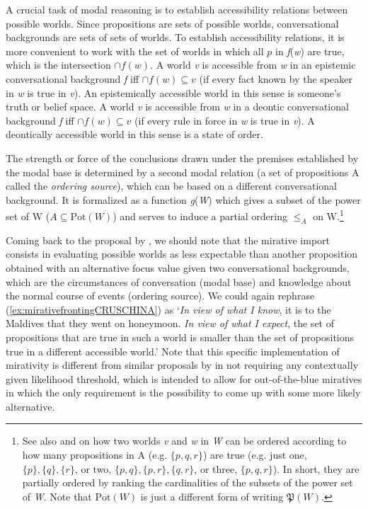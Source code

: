 A crucial task of modal reasoning is to establish accessibility relations between possible worlds. Since propositions are sets of possible worlds, conversational backgrounds are sets of sets of worlds. To establish accessibility relations, it is more convenient to work with the set of worlds in which all $p$ in \textit{f}(\textit{w}) are true, which is the intersection $\cap f(w)$. A world \textit{v} is accessible from \textit{w} in an epistemic conversational background \textit{f} iff $\cap f(w) \subseteq v$ (if every fact known by the speaker in \textit{w} is true in \textit{v}). An epistemically accessible world in this sense is someone's truth or belief space. A world \textit{v} is accessible from \textit{w} in a deontic conversational background \textit{f} iff $\cap f(w)\subseteq v$ (if every rule in force in \textit{w} is true in \textit{v}). A deontically accessible world in this sense is a state of order. 

The strength or force of the conclusions drawn under the premises established by the modal base is determined by a second modal relation (a set of propositions A called the \textit{ordering source}), which can be based on a different conversational background. It is formalized as a function \textit{g}(\textit{W}) which gives a subset of the power set of W ($A \subseteq \text{Pot}(W)$) and serves to induce a partial ordering $\leq_A$ on W.\footnote{See also \citet[644]{Kratzer.1991} and \citet[64]{Portner.2009} on how two worlds \textit{v} and \textit{w} in \textit{W} can be ordered according to how many propositions in A (e.g. $\{p,q,r\}$) are true (e.g. just one, $\{p\}, \{q\}, \{r\}$, or two, $\{p,q\}, \{p,r\}, \{q,r\}$, or three, $\{p,q,r\}$). In short, they are partially ordered by ranking the cardinalities of the subsets of the power set of \textit{W}. Note that $\text{Pot}(W)$ is just a different form of writing $\mathfrak{P}(W)$.}

Coming back to the proposal by \citet{BianchiBocciCruschina.2016}, we should note that the mirative import consists in evaluating possible worlds as less expectable than another proposition obtained with an alternative focus value given two conversational backgrounds, which are the circumstances of conversation (modal base) and knowledge about the normal course of events (ordering source). We could again rephrase (\ref{ex:mirativefrontingCRUSCHINA}) as `\textit{In view of what I know}, it is to the Maldives that they went on honeymoon. \textit{In view of what I expect}, the set of propositions that are true in such a world is smaller than the set of propositions true in a different accessible world.' Note that this specific implementation of mirativity is different from similar proposals by \citet{Grosz.2012} in not requiring any contextually given likelihood threshold, which is intended to allow for out-of-the-blue miratives in which the only requirement is the possibility to come up with some more likely alternative.

